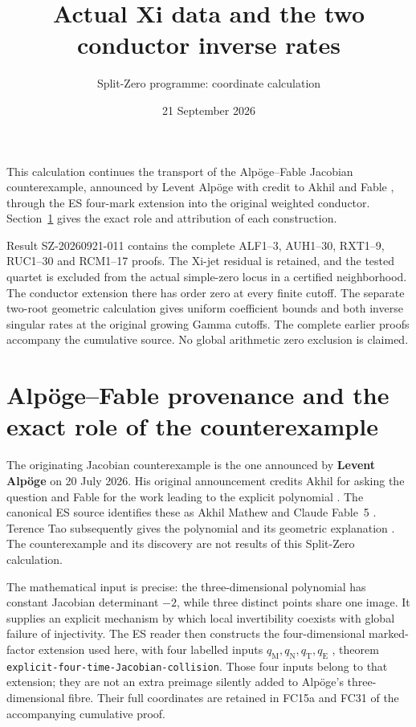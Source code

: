 \documentclass[11pt]{article}
\title{Actual Xi data and the two conductor inverse rates}
\author{Split-Zero programme: coordinate calculation}
\date{21 September 2026}
\begin{document}
\maketitle
\noindent This calculation continues the transport of the
Alp\"oge--Fable Jacobian counterexample, announced by Levent Alp\"oge
with credit to Akhil and Fable \cite{AlpogeAnnouncement}, through
the ES four-mark extension \cite{ES488} into the original weighted
conductor. Section~\ref{sec:alpoge-fable-role} gives the exact role
and attribution of each construction.

\noindent Result SZ-20260921-011 contains the complete ALF1--3, AUH1--30, RXT1--9,
RUC1--30 and RCM1--17 proofs. The Xi-jet residual is retained,
and the tested quartet is excluded from the actual simple-zero
locus in a certified neighborhood. The conductor extension there
has order zero at every finite cutoff. The separate two-root
geometric calculation gives uniform coefficient bounds and both
inverse singular rates at the original growing Gamma cutoffs.
The complete earlier proofs accompany the cumulative source.
No global arithmetic zero exclusion is claimed.
\tableofcontents\clearpage
\section{Alp\"oge--Fable provenance and the exact role of the counterexample}
\label{sec:alpoge-fable-role}

The originating Jacobian counterexample is the one announced by
\textbf{Levent Alp\"oge} on 20 July 2026. His original announcement
credits Akhil for asking the question and Fable for the work leading
to the explicit polynomial \cite{AlpogeAnnouncement}. The canonical
ES source identifies these as Akhil Mathew and Claude Fable~5
\cite{ES488}. Terence Tao subsequently gives the polynomial and
its geometric explanation \cite{Tao}. The counterexample and its
discovery are not results of this Split-Zero calculation.

The mathematical input is precise: the three-dimensional polynomial
has constant Jacobian determinant $-2$, while three distinct points
share one image. It supplies an explicit mechanism by which local
invertibility coexists with global failure of injectivity. The ES
reader then constructs the four-dimensional marked-factor extension
used here, with four labelled inputs $q_{\mathrm M},q_{\mathrm N},
q_{\mathrm T},q_{\mathrm E}$ \cite{ES488}, theorem
\texttt{explicit-four-time-Jacobian-collision}. Those four inputs
belong to that extension; they are not an extra preimage silently
added to Alp\"oge's three-dimensional fibre. Their full coordinates
are retained in FC15a and FC31 of the accompanying cumulative proof.
\end{document}
